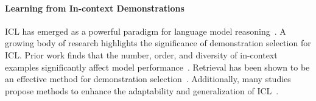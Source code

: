 \paragraph{Learning from In-context Demonstrations}
ICL has emerged as a powerful paradigm for language model reasoning~\citep{dong-etal-2024-survey}. A growing body of research highlights the significance of demonstration selection for ICL. Prior work finds that the number, order, and diversity of in-context examples significantly affect model performance~\citep{min-etal-2022-rethinking, levy-etal-2023-diverse, peng-etal-2024-revisiting}. Retrieval has been shown to be an effective method for demonstration selection~\citep{li-etal-2023-unified, DBLP:conf/nips/ZhangZ023, DBLP:journals/corr/abs-2401-11624, gao2025learning}. Additionally, many studies propose methods to enhance the adaptability and generalization of ICL~\citep{metaICL,DBLP:conf/icml/LiIPO23,xu-etal-2023-unleash, wei-etal-2023-symbol}.

